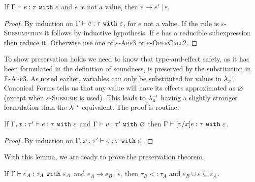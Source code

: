 \begin{theorem}[Progress]
If $ \Gamma \vdash  e:  \tau~\mathtt{with}~ \varepsilon$ and $ e$ is not a value, then $ e \longrightarrow  e'~|~\varepsilon$.
\end{theorem}

\begin{proof} By induction on $ \Gamma \vdash  e:  \tau~\mathtt{with}~ \varepsilon$, for $ e$ not a value. If the rule is \textsc{$\varepsilon$-Subsumption} it follows by inductive hypothesis. If $ e$ has a reducible subexpression then reduce it. Otherwise use one of \textsc{$\varepsilon$-App3} or \textsc{$\varepsilon$-OperCall2}.
\end{proof}

To show preservation holds we need to know that type-and-effect safety, as it has been formulated in the definition of soundness, is preserved by the substitution in \textsc{E-App3}. As noted earlier, variables can only be substituted for values in $\lambda^{\rightarrow}_{\pi}$. Canonical Forms tells us that any value will have its effects approximated as $\varnothing$ (except when \textsc{$\varepsilon$-Subsume} is used). This leads to $\lambda^{\rightarrow}_{\pi}$ having a slightly stronger formulation than the $\lambda^{\rightarrow}$ equivalent. The proof is routine.

\begin{lemma}[Substitution]
If $\Gamma, x: \tau' \vdash e: \tau~\mathtt{with}~ \varepsilon$ and $\Gamma \vdash v: \tau'~\mathtt{with}~ \varnothing$ then $\Gamma \vdash [v/x]e: \tau~\mathtt{with}~ \varepsilon$.
\end{lemma}

\begin{proof} By induction on $\Gamma, x: \tau' \vdash e: \tau~\mathtt{with}~ \varepsilon$.
\end{proof}

With this lemma, we are ready to prove the preservation theorem.

\begin{theorem}[Preservation]
If $\Gamma \vdash e_A: \tau_A~\mathtt{with}~ \varepsilon_A$ and $e_A \longrightarrow e_B~|~\varepsilon$, then $\tau_B <: \tau_A$ and $\varepsilon_B \cup \varepsilon \subseteq \varepsilon_A$.
\end{theorem}

